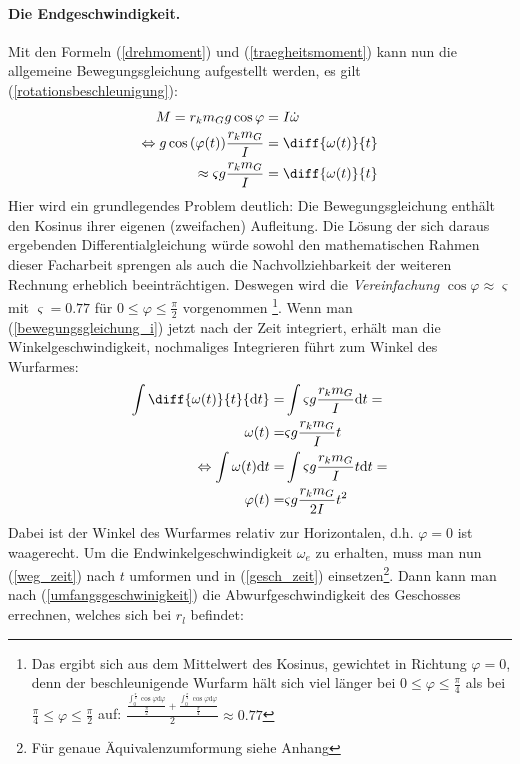 \paragraph{Die Endgeschwindigkeit.}
Mit den Formeln (\ref{drehmoment}) und (\ref{traegheitsmoment}) kann nun die allgemeine Bewegungsgleichung aufgestellt werden, es gilt (\ref{rotationsbeschleunigung}):
\begin{align}
M = r_k m_G g \cos{\varphi}  &= I \dot{\omega}\\
\Leftrightarrow g  \cos{(\varphi(t))} \frac{r_k m_G}{I} &=\diff{\omega(t)}{t}\\
\label{bewegungsgleichung_i}
\approx  \varsigma g\frac{r_k m_G}{I} &=\diff{\omega(t)}{t}
\end{align}
Hier wird ein grundlegendes Problem deutlich: Die Bewegungsgleichung enthält den Kosinus ihrer eigenen (zweifachen) Aufleitung. Die Lösung der sich daraus ergebenden Differentialgleichung würde sowohl den mathematischen Rahmen dieser Facharbeit sprengen als auch die Nachvollziehbarkeit der weiteren Rechnung erheblich beeinträchtigen.
Deswegen wird die \emph{Vereinfachung} $\cos{\varphi}\approx \varsigma$ mit $\varsigma=0.77$ für $0\le\varphi\le\frac{\pi}{2}$ vorgenommen
\footnote{Das ergibt sich aus dem Mittelwert des Kosinus, gewichtet in Richtung $\varphi=0$, denn der beschleunigende Wurfarm hält sich viel länger bei $0\le\varphi\le\frac{\pi}{4}$ als bei $\frac{\pi}{4}\le\varphi\le\frac{\pi}{2}$ auf:
 $\frac{ \frac{
 		\int_
 			{0} ^\frac{\pi}{2} 
 			\cos{\varphi}\mathrm d\varphi}{
 			\frac{\pi}{2}
 		} +
 		 \frac{
 		\int_
 			{0} ^\frac{\pi}{4} 
 			\cos{\varphi}\mathrm d\varphi
 		}{
 			\frac{\pi}{4}
 		}}{2}\approx 0.77 $
}.
Wenn man (\ref{bewegungsgleichung_i}) jetzt nach der Zeit integriert, erhält man die Winkelgeschwindigkeit, nochmaliges Integrieren führt zum Winkel des Wurfarmes:
\begin{align}
\nonumber
\int\diff{\omega(t)}{t}{\mathrm d t}=&\int{\varsigma g\frac{r_k m_G}{I}}{\mathrm d t}=\\
\label{gesch_zeit}
\omega(t)=&\varsigma g\frac{ r_k m_G}{I}t\\
\nonumber
\Leftrightarrow \int{\omega(t)}\mathrm d t=&\int{\varsigma g\frac{r_k m_G}{I}t}{\mathrm d t}=\\
\label{weg_zeit}
\varphi(t)=&\varsigma g\frac{r_k m_G}{2I}t^2
\end{align}
Dabei ist der Winkel des Wurfarmes relativ zur Horizontalen, d.h. $\varphi=0$ ist waagerecht. Um die Endwinkelgeschwindigkeit $\omega_{e}$ zu erhalten, muss man nun (\ref{weg_zeit}) nach $t$ umformen und in (\ref{gesch_zeit}) einsetzen\footnote{Für genaue Äquivalenzumformung siehe Anhang}. Dann kann man nach (\ref{umfangsgeschwinigkeit}) die Abwurfgeschwindigkeit des Geschosses errechnen, welches sich bei $r_l$ befindet:
